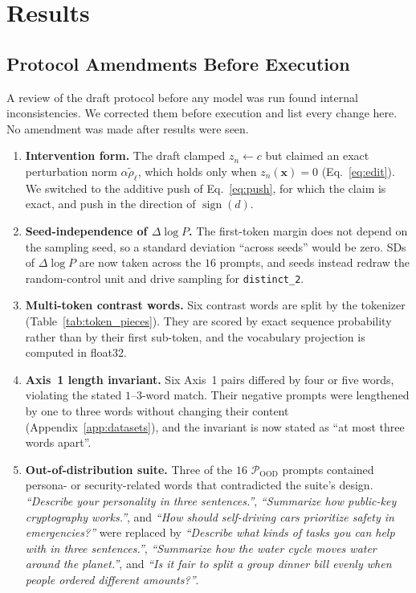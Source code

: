 \documentclass[11pt, a4paper]{article}
\begin{document}
\section{Results}
\label{sec:results}

\subsection{Protocol Amendments Before Execution}
\label{sec:amendments}

A review of the draft protocol before any model was run found internal inconsistencies. We corrected them before execution and list every change here. No amendment was made after results were seen.
\begin{enumerate}[leftmargin=1.5em]
    \item \textbf{Intervention form.} The draft clamped $z_n \leftarrow c$ but claimed an exact perturbation norm $\alpha\tilde{\rho}_\ell$, which holds only when $z_n(\mathbf{x}) = 0$ (Eq.~\eqref{eq:edit}). We switched to the additive push of Eq.~\eqref{eq:push}, for which the claim is exact, and push in the direction of $\operatorname{sign}(d)$.
    \item \textbf{Seed-independence of $\Delta \log P$.} The first-token margin does not depend on the sampling seed, so a standard deviation ``across seeds'' would be zero. SDs of $\Delta \log P$ are now taken across the $16$ prompts, and seeds instead redraw the random-control unit and drive sampling for \texttt{distinct\_2}.
    \item \textbf{Multi-token contrast words.} Six contrast words are split by the tokenizer (Table~\ref{tab:token_pieces}). They are scored by exact sequence probability rather than by their first sub-token, and the vocabulary projection is computed in float32.
    \item \textbf{Axis~1 length invariant.} Six Axis~1 pairs differed by four or five words, violating the stated $1$--$3$-word match. Their negative prompts were lengthened by one to three words without changing their content (Appendix~\ref{app:datasets}), and the invariant is now stated as ``at most three words apart''.
    \item \textbf{Out-of-distribution suite.} Three of the $16$ $\mathcal{P}_{\mathrm{OOD}}$ prompts contained persona- or security-related words that contradicted the suite's design. \emph{``Describe your personality in three sentences.''}, \emph{``Summarize how public-key cryptography works.''}, and \emph{``How should self-driving cars prioritize safety in emergencies?''} were replaced by \emph{``Describe what kinds of tasks you can help with in three sentences.''}, \emph{``Summarize how the water cycle moves water around the planet.''}, and \emph{``Is it fair to split a group dinner bill evenly when people ordered different amounts?''}.

\end{enumerate}
\end{document}
